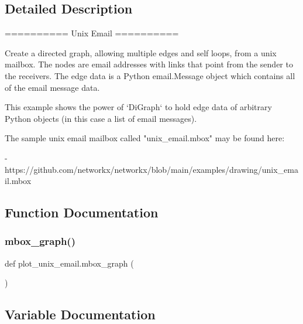 \subsection{Detailed Description}
\begin{DoxyVerb}==========
Unix Email
==========

Create a directed graph, allowing multiple edges and self loops, from a unix
mailbox.  The nodes are email addresses with links that point from the sender
to the receivers.  The edge data is a Python email.Message object which
contains all of the email message data.

This example shows the power of `DiGraph` to hold edge data of arbitrary Python
objects (in this case a list of email messages).


The sample unix email mailbox called "unix_email.mbox" may be found here:

- https://github.com/networkx/networkx/blob/main/examples/drawing/unix_email.mbox
\end{DoxyVerb}
 

\subsection{Function Documentation}
\mbox{\label{namespaceplot__unix__email_abb82e3bfc1f62ff0f0f72309b9fa8ccc}} 
\subsubsection{\texorpdfstring{mbox\+\_\+graph()}{mbox\_graph()}}
{\footnotesize\ttfamily def plot\+\_\+unix\+\_\+email.\+mbox\+\_\+graph (\begin{DoxyParamCaption}{ }\end{DoxyParamCaption})}



\subsection{Variable Documentation}
\mbox{\label{namespaceplot__unix__email_ad6e13a9ac11888732ef7af3e6fe0a16d}} 
